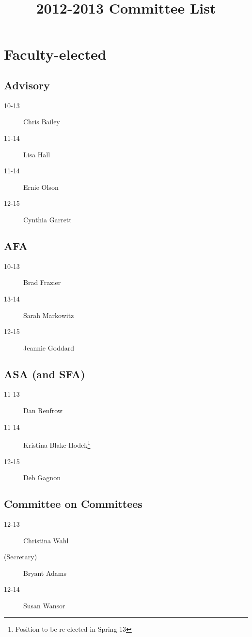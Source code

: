 \documentclass[10pt, twocolumn]{amsart}
\title{2012-2013 Committee List}
\newcommand{\noteMajor}[1]{}
\begin{document}
\maketitle

\section*{Faculty-elected}
\subsection*{Advisory}
\begin{description}
\item[10-13] Chris Bailey \noteMajor{Chemistry}
\item[11-14] Lisa Hall \noteMajor{Women's Studies}
\item[11-14] Ernie Olson \noteMajor{Anthropology and Religion}
\item[12-15] Cynthia Garrett \noteMajor{English}
\end{description}

\subsection*{AFA}
\begin{description}
\item[10-13] Brad Frazier
\item[13-14] Sarah Markowitz
\item[12-15] Jeannie Goddard
\end{description}

\subsection*{ASA (and SFA)}
\begin{description}
\item[11-13] Dan Renfrow
\item[11-14] Kristina Blake-Hodek\footnote{Position to be re-elected in Spring 13}
\item[12-15] Deb Gagnon
\end{description}

\subsection*{Committee on Committees}
\begin{description}
\item[12-13] Christina Wahl
\item[(Secretary)] Bryant Adams
\item[12-14] Susan Wansor
\end{description}
\end{document}
